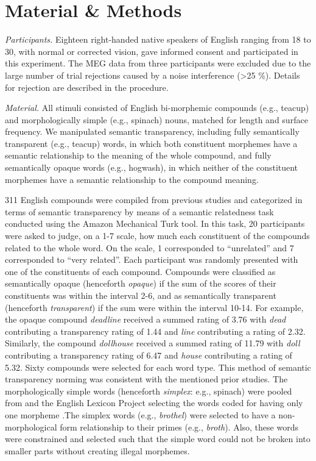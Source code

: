\documentclass{frontiersSCNS}
\begin{document}
\section{Material \& Methods}

\textit{Participants.} Eighteen right-handed native speakers of English ranging from 18 to 30, with normal or corrected vision, gave informed consent and participated in this experiment. The MEG data from three participants were excluded due to the large number of trial rejections caused by a noise interference (\textgreater 25 \%). Details for rejection are described in the procedure.

\textit{Material.}  All stimuli consisted of English bi-morphemic compounds (e.g., teacup) and morphologically simple (e.g., spinach) nouns, matched for length and surface frequency. We manipulated semantic transparency, including fully semantically transparent (e.g., teacup) words, in which both constituent morphemes have a semantic relationship to the meaning of the whole compound, and fully semantically opaque words (e.g., hogwash), in which neither of the constituent morphemes have a semantic relationship to the compound meaning.

	311 English compounds were compiled from previous studies \citep*{Drieghe:2010, Fiorentino:2007, Fiorentino:2009, Juhasz:2003} and categorized in terms of semantic transparency by means of a semantic relatedness task conducted using the Amazon Mechanical Turk tool. In this task, 20 participants were asked to judge, on a 1-7 scale, how much each constituent of the compounds related to the whole word.  On the scale, 1 corresponded to “unrelated” and 7 corresponded to “very related”.  Each participant was randomly presented with one of the constituents of each compound.  Compounds were classified as semantically opaque (henceforth \textit{opaque}) if the sum of the scores of their constituents was within the interval 2-6, and as semantically transparent (henceforth \textit{transparent}) if the sum were within the interval 10-14. For example, the opaque compound \textit{deadline} received a summed rating of 3.76 with \textit{dead} contributing a transparency rating of 1.44 and \textit{line} contributing a rating of 2.32. Similarly, the compound \textit{dollhouse} received a summed rating of 11.79 with \textit{doll} contributing a transparency rating of 6.47 and \textit{house} contributing a rating of 5.32. Sixty compounds were selected for each word type. This method of semantic transparency norming was consistent with the mentioned prior studies. 
	The morphologically simple words (henceforth \textit{simplex}: e.g., spinach) were pooled from \citet{Rastle:2004} and the English Lexicon Project selecting the words coded for having only one morpheme \citep*{Balota:2007}.The simplex words (e.g., \textit{brothel}) were selected to have a non-morphological form relationship to their primes (e.g., \textit{broth}). Also, these words were constrained and selected such that the simple word could not be broken into smaller parts without creating illegal morphemes.
 
\end{document}
